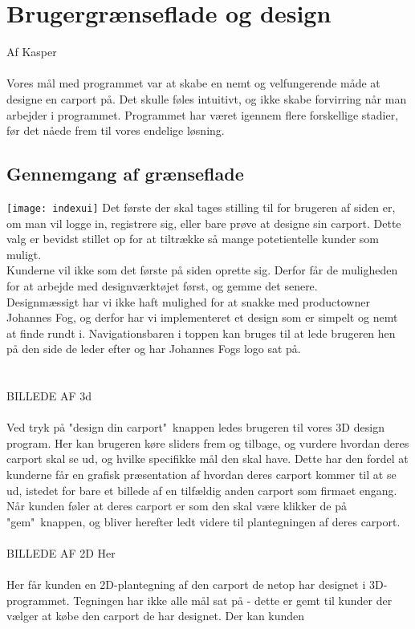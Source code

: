 \section{Brugergrænseflade og design}
Af Kasper\\\\
Vores mål med programmet var at skabe en nemt og velfungerende måde at designe en carport på.
Det skulle føles intuitivt, og ikke skabe forvirring når man arbejder i programmet.
Programmet har været igennem flere forskellige stadier, før det nåede frem til vores endelige løsning.
\\
\subsection{Gennemgang af grænseflade}
\texttt{[image: indexui]}
Det første der skal tages stilling til for brugeren af siden er, om man vil logge in, registrere sig, eller bare prøve at designe sin carport.
Dette valg er bevidst stillet op for at tiltrække så mange potetientelle kunder som muligt.\\
Kunderne vil ikke som det første på siden oprette sig. Derfor får de muligheden for at arbejde med designværktøjet først, og gemme det senere.\\
Designmæssigt har vi ikke haft mulighed for at snakke med productowner Johannes Fog, og derfor har vi implementeret et design som er simpelt og nemt at finde rundt i.
Navigationsbaren i toppen kan bruges til at lede brugeren hen på den side de leder efter og har Johannes Fogs logo sat på.\\
\\\\
BILLEDE AF 3d
\\\\
Ved tryk på "design din carport"\ knappen ledes brugeren til vores 3D design program. Her kan brugeren køre sliders frem og tilbage, og vurdere hvordan deres carport skal se ud, og hvilke specifikke mål den skal have. Dette har den fordel at kunderne får en grafisk præsentation af hvordan deres carport kommer til at se ud, istedet for bare et billede af en tilfældig anden carport som firmaet engang. Når kunden føler at deres carport er som den skal være klikker de på "gem"\ knappen, og bliver herefter ledt videre til plantegningen af deres carport.
\\\\
BILLEDE AF 2D Her
\\\\
Her får kunden en 2D-plantegning af den carport de netop har designet i 3D-programmet. Tegningen har ikke alle mål sat på - dette er gemt til kunder der vælger at købe den carport de har designet. Der kan kunden 


